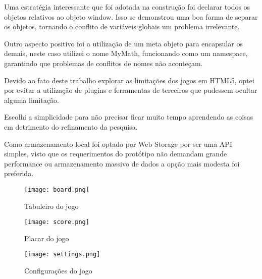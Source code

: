 \begin{draft}
Uma estratégia interessante que foi adotada na construção foi
declarar todos os objetos relativos ao objeto window. Isso se demonstrou
uma boa forma de separar os objetos, tornando o conflito de variáveis
globais um problema irrelevante.

Outro aspecto positivo foi a utilização de um meta objeto para encapsular
os demais, neste caso utilizei o nome MyMath, funcionando como um namespace,
garantindo que problemas de conflitos de nomes não aconteçam.

Devido ao fato deste trabalho explorar as limitações dos jogos em
HTML5, optei por evitar a utilização de plugins e ferramentas de
terceiros que pudessem ocultar alguma limitação.

Escolhi a simplicidade para não precisar ficar muito tempo aprendendo
as coisas em detrimento do refinamento da pesquisa.

Como armazenamento local foi optado por Web Storage por ser uma API simples,
visto que os requerimentos do protótipo não demandam grande performance ou
armazenamento massivo de dados a opção mais modesta foi preferida.

\end{draft}
\begin{figure}
    \centering
    \texttt{[image: board.png]}
	\caption{Tabuleiro do jogo}
\end{figure}

\begin{figure}
    \centering
    \texttt{[image: score.png]}
	\caption{Placar do jogo}
\end{figure}

\begin{figure}
    \centering
    \texttt{[image: settings.png]}
	\caption{Configurações do jogo}
\end{figure}

